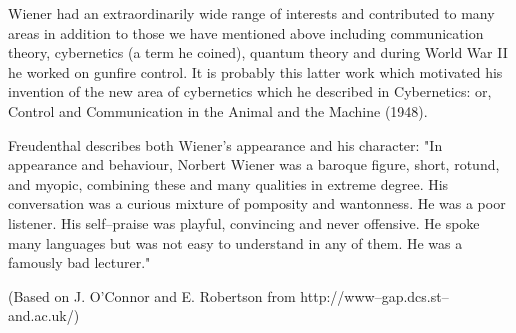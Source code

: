 Wiener had an extraordinarily wide range of interests and contributed to many areas in addition to those we have mentioned above including communication theory, cybernetics (a term he coined), quantum theory and during World War II he worked on gunfire control. It is probably this latter work which motivated his invention of the new area of cybernetics which he described in Cybernetics: or, Control and Communication in the Animal and the Machine (1948). 

Freudenthal describes both Wiener's appearance and his character: "In appearance and behaviour, Norbert Wiener was a baroque figure, short, rotund, and myopic, combining these and many qualities in extreme degree. His conversation was a curious mixture of pomposity and wantonness. He was a poor listener. His self--praise was playful, convincing and never offensive. He spoke many languages but was not easy to understand in any of them. He was a famously bad lecturer." 

(Based on J. O'Connor and E. Robertson from http://www--gap.dcs.st--and.ac.uk/)